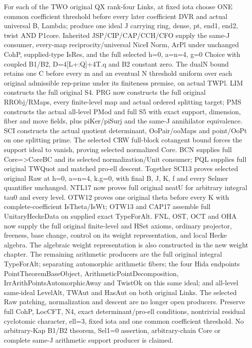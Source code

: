 For each of the TWO original QX rank-four Links, at fixed iota choose ONE common coefficient threshold before every later coefficient DVR and actual universal B,\allowbreak{} Lambda; produce one ideal J carrying ring,\allowbreak{} dense,\allowbreak{} pt,\allowbreak{} end1,\allowbreak{} end2,\allowbreak{} twist AND P1core. Inherited JSP/\allowbreak{}CIP/\allowbreak{}CAP/\allowbreak{}CCH/\allowbreak{}CFO supply the same-J consumer, every-map reciprocity/\allowbreak{}universal NiceI Norm, ArPl under unchanged CohP, supplied-type IsRes, and the full selected h=0,\allowbreak{} a=n=4,\allowbreak{} g=0 Choice with coupled B1/\allowbreak{}B2, D=4[L+:Q]+4T.q and B2 constant zero. The dualN bound retains one C before every m and an eventual N threshold uniform over each original admissible rep-prime under its finiteness premise, on actual TWPl. LIM constructs the full original S4. PRG now constructs the full original RRObj/\allowbreak{}RMaps, every finite-level map and actual ordered splitting target; PMS constructs the actual all-level PMod and full S5 with exact support, dimension, fiber and move fields, plus piKer/\allowbreak{}piSurj and the same-J annihilator equivalence. SCI constructs the actual quotient determinant, OoPair/\allowbreak{}ooMaps and point/\allowbreak{}OoPt on one splitting prime. The selected CRW full-block cotangent bound forces the support ideal to vanish, proving selected normalized Core. BCN supplies full Core=>CoreBC and its selected normalization/\allowbreak{}Unit consumer; PQL supplies full original TWQuot and matched pro-ell descent. Together SCI13 proves selected original Raw at h=0,\allowbreak{} a=n=4,\allowbreak{} k.g=0, with final B,\allowbreak{} J,\allowbreak{} K,\allowbreak{} f and every Selmer quantifier unchanged. NTL17 now proves full original neatU for arbitrary integral tau0 and every level. OTW12 proves one original theta before every K with complete-coefficient IsTheta/\allowbreak{}IsWt; OTW13 and CAP17 assemble full UnitaryHeckeData on supplied exact TypeForAlt. FNL, OST, OCT and OHA now supply the full original finite-level and HSet axioms, ordinary projector, freeness, base change, control on its weight representation, and local Hecke algebra. The algebraic weight representation is also constructed in the new weight chapter. The remaining arithmetic producers are the full original integral TypeForAlt; separating automorphic arithmetic fibers; the four Hida endpoints PointTheoremBaseObject, ArithmeticPointDecomposition, IrrArithPointsAutomorphicAway and TwistOk on this same ideal; and all-level same-ideal LevelAlt, TWAut and HasAut on both original Links. The selected Raw patching, normalization and descent are no longer open producers. Preserve full CohP, LocCFT, N4, exact determinant/\allowbreak{}pro-ell conditions, nontrivial residual cyclotomic character, ell=3, fixed iota and one common coefficient threshold. No arbitrary-Kap B1/\allowbreak{}B2 theorem, Sel1=0 assertion, arbitrary-chain Core or complete same-J arithmetic support producer is claimed.


